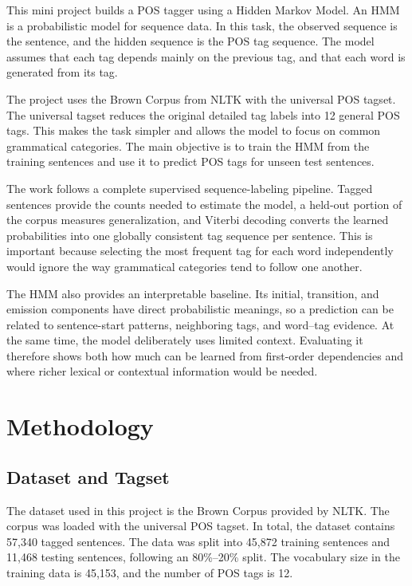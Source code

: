 \documentclass[12pt,a4paper]{article}
\begin{document}
This mini project builds a POS tagger using a Hidden Markov Model. An HMM is a
probabilistic model for sequence data. In this task, the observed sequence is the
sentence, and the hidden sequence is the POS tag sequence. The model assumes that
each tag depends mainly on the previous tag, and that each word is generated from
its tag.

The project uses the Brown Corpus from NLTK with the universal POS tagset. The
universal tagset reduces the original detailed tag labels into 12 general POS
tags. This makes the task simpler and allows the model to focus on common
grammatical categories. The main objective is to train the HMM from the training
sentences and use it to predict POS tags for unseen test sentences.

The work follows a complete supervised sequence-labeling pipeline. Tagged
sentences provide the counts needed to estimate the model, a held-out portion of
the corpus measures generalization, and Viterbi decoding converts the learned
probabilities into one globally consistent tag sequence per sentence. This is
important because selecting the most frequent tag for each word independently
would ignore the way grammatical categories tend to follow one another.

The HMM also provides an interpretable baseline. Its initial, transition, and
emission components have direct probabilistic meanings, so a prediction can be
related to sentence-start patterns, neighboring tags, and word--tag evidence.
At the same time, the model deliberately uses limited context. Evaluating it
therefore shows both how much can be learned from first-order dependencies and
where richer lexical or contextual information would be needed.

\section{Methodology}

\subsection{Dataset and Tagset}

The dataset used in this project is the Brown Corpus provided by NLTK. The
corpus was loaded with the universal POS tagset. In total, the dataset contains
57,340 tagged sentences. The data was split into 45,872 training sentences and
11,468 testing sentences, following an 80\%--20\% split. The vocabulary size in
the training data is 45,153, and the number of POS tags is 12.
\end{document}
